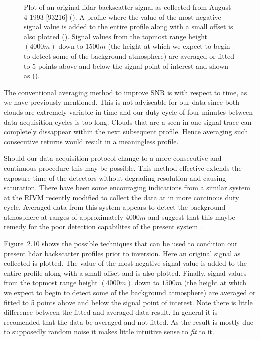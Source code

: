 \begin{figure}
\vspace{5.0in}
\caption{Plot of an original lidar backscatter signal as collected 
from August 4 1993 [93216] ({\DOTTED}). A profile where the value of the
most negative signal value is added to the entire profile along with
a small offset is also plotted ({\DASHED}). Signal values from
the topmost range height $(4000 m)$ down to $1500 m$ (the height 
at which we expect to begin to detect some of the background 
atmosphere) are averaged or fitted to 5 points above and below
the signal point of interest and shown as ({\SOLID}).}
\end{figure}

The conventional averaging method to improve SNR is with respect
to time, as we have previously mentioned. 
This is not adviseable for our data since both clouds are
extremely variable in time and our duty cycle of four minutes
between data acquisition cycles is too long. Clouds that are
a seen in one signal trace can completely dissappear within
the next subsequent profile. Hence averaging such consecutive
returns would result in a meaningless profile.

Should our data acquisition protocol change to a more consecutive
and continuous procedure this may be possible. This method
effective extends the exposure time of the detectors without
degrading resolution and causing saturation. There have been
some encouraging indications from a similar system 
at the RIVM recently modified to collect the data at in more continous 
duty cycle. Averaged data from this system appears to detect
the background atmosphere at ranges of approximately $4000 m$ 
and suggest that this maybe remedy for the poor detection 
capabilites of the present system \cite{evpd}.

Figure~{2.10} shows the possible techniques that can be used
to condition our present lidar backscatter profiles prior to inversion.
Here an original signal as collected is plotted. The value of the
most negative signal value is added to the entire profile along with
a small offset and is also plotted. Finally, signal values from
the topmost range height $(4000 m)$ down to $1500 m$ (the height 
at which we expect to begin to detect some of the background 
atmosphere) are averaged or fitted to 5 points above and below
the signal point of interest. Note there is little difference
between the fitted and averaged data result. In general it
is recomended that the data be averaged and not fitted. As the result is
mostly due to supposedly random noise it makes 
little intuitive sense to {\em fit} to it.

